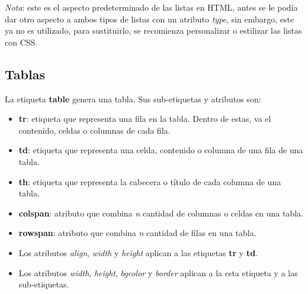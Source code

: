 \textit{Nota}: este es el aspecto predeterminado de las listas en HTML, antes se le podía dar otro aspecto a ambos tipos de listas con un atributo \textit{type}, sin embargo, este ya no es utilizado, para sustituirlo, se recomienza personalizar o estilizar las listas con CSS.


\subsection{Tablas}
\hspace{0.55cm}La etiqueta \textbf{table} genera una tabla. Sus sub-etiquetas y atributos son:
\begin{itemize}
    \item \textbf{tr}: etiqueta que representa una fila en la tabla. Dentro de estas, va el contenido, celdas o columnas de cada fila.
    \item \textbf{td}: etiqueta que representa una celda, contenido o columna de una fila de una tabla.
    \item \textbf{th}: etiqueta que representa la cabecera o título de cada columna de una tabla.
    \item \textbf{colspan}: atributo que combina \textit{n} cantidad de columnas o celdas en una tabla.
    \item \textbf{rowspan}: atributo que combina \textit{n} cantidad de filas en una tabla.
    \item Los atributos \textit{align}, \textit{width} y \textit{height} aplican a las etiquetas \textbf{tr} y \textbf{td}.
    \item Los atributos \textit{width}, \textit{height}, \textit{bgcolor} y \textit{border} aplican a la esta etiqueta y a las sub-etiquetas.
\end{itemize}

